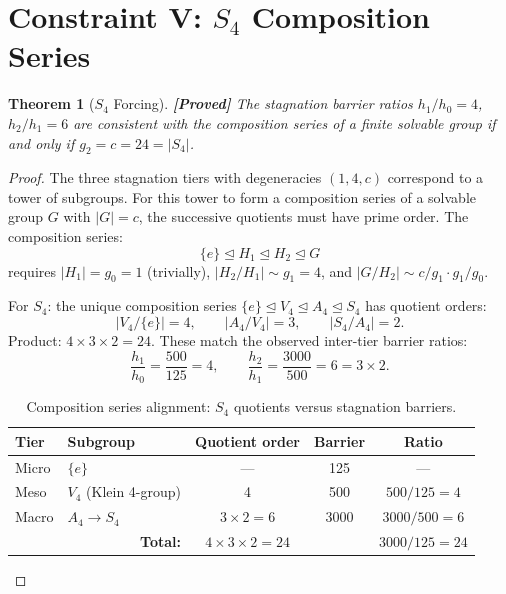 \documentclass[12pt,a4paper]{article}
\newcommand{\proved}[1]{\textcolor{proved}{\textbf{[Proved]}} #1}
\newtheorem{theorem}{Theorem}[section]
\theoremstyle{definition}
\theoremstyle{remark}
\newcommand{\Sfour}{S_4}
\newcommand{\Vfour}{V_4}
\newcommand{\Afour}{A_4}
\begin{document}
\section{Constraint V: $\Sfour$ Composition Series}
\label{sec:c5}

\begin{theorem}[$\Sfour$ Forcing]
\label{thm:c5}
\proved{The stagnation barrier ratios $h_1/h_0 = 4$, $h_2/h_1 = 6$ are consistent with the composition series of a finite solvable group if and only if $g_2 = c = 24 = |\Sfour|$.}
\end{theorem}

\begin{proof}
The three stagnation tiers with degeneracies $(1, 4, c)$ correspond to a tower of subgroups.  For this tower to form a composition series of a solvable group $G$ with $|G| = c$, the successive quotients must have prime order.  The composition series:
\begin{equation}
\{e\} \trianglelefteq H_1 \trianglelefteq H_2 \trianglelefteq G
\end{equation}
requires $|H_1| = g_0 = 1$ (trivially), $|H_2/H_1| \sim g_1 = 4$, and $|G/H_2| \sim c/g_1 \cdot g_1/g_0$.

For $\Sfour$: the unique composition series $\{e\} \trianglelefteq \Vfour \trianglelefteq \Afour \trianglelefteq \Sfour$ has quotient orders:
\begin{equation}
|\Vfour/\{e\}| = 4, \qquad |\Afour/\Vfour| = 3, \qquad |\Sfour/\Afour| = 2.
\end{equation}
Product: $4 \times 3 \times 2 = 24$.  These match the observed inter-tier barrier ratios:
\begin{equation}
\frac{h_1}{h_0} = \frac{500}{125} = 4, \qquad \frac{h_2}{h_1} = \frac{3000}{500} = 6 = 3 \times 2.
\end{equation}

\begin{table}[H]
\centering
\caption{Composition series alignment: $\Sfour$ quotients versus stagnation barriers.}
\label{tab:s4}
\begin{tabular}{@{}llccc@{}}
\toprule
\textbf{Tier} & \textbf{Subgroup} & \textbf{Quotient order} & \textbf{Barrier} & \textbf{Ratio} \\
\midrule
Micro & $\{e\}$ & --- & 125 & --- \\
Meso & $\Vfour$ (Klein 4-group) & 4 & 500 & $500/125 = 4$ \\
Macro & $\Afour \to \Sfour$ & $3 \times 2 = 6$ & 3000 & $3000/500 = 6$ \\
\midrule
\multicolumn{2}{r}{\textbf{Total:}} & $4 \times 3 \times 2 = 24$ & & $3000/125 = 24$ \\
\bottomrule
\end{tabular}
\end{table}


\end{proof}
\end{document}

